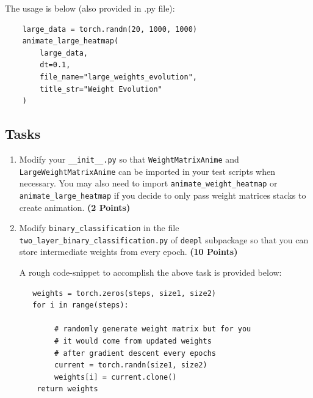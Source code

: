 \documentclass[12pt, xcolor=dvipsnames,svgnames,x11names]{article}
\begin{document}
The usage is below (also provided in .py file):

\begin{verbatim}
    large_data = torch.randn(20, 1000, 1000) 
    animate_large_heatmap(
        large_data, 
        dt=0.1,
        file_name="large_weights_evolution",
        title_str="Weight Evolution"
    )

\end{verbatim}


\subsection{Tasks}


\begin{enumerate}
\item Modify your  \texttt{__init__.py}  so that \texttt{WeightMatrixAnime} and \texttt{LargeWeightMatrixAnime} can be imported in your test scripts when necessary. You may also need to import  \texttt{animate_weight_heatmap} or \texttt{animate_large_heatmap} if you decide to only pass weight matrices stacks to create animation.  \hfill \textbf{(2 Points)}


\item Modify \texttt{binary_classification} in the file  \texttt{two_layer_binary_classification.py} of \texttt{deepl} subpackage so that you can store intermediate weights from every epoch. \hfill \textbf{(10 Points)}

A rough code-snippet to accomplish the above task is provided below:


\begin{verbatim}
   weights = torch.zeros(steps, size1, size2)
   for i in range(steps):
   
   		# randomly generate weight matrix but for you 
   		# it would come from updated weights 
   		# after gradient descent every epochs
        current = torch.randn(size1, size2)
        weights[i] = current.clone()
    return weights

\end{verbatim}


\end{enumerate}
\end{document}
